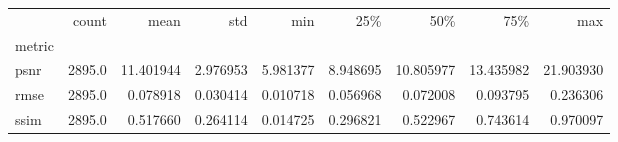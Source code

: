 \begin{tabular}{lrrrrrrrr}
	\toprule
	{}     & count  & mean      & std      & min      & 25\%     & 50\%      & 75\%      & max       \\
	metric &        &           &          &          &          &           &           &           \\
	\midrule
	psnr   & 2895.0 & 11.401944 & 2.976953 & 5.981377 & 8.948695 & 10.805977 & 13.435982 & 21.903930 \\
	rmse   & 2895.0 & 0.078918  & 0.030414 & 0.010718 & 0.056968 & 0.072008  & 0.093795  & 0.236306  \\
	ssim   & 2895.0 & 0.517660  & 0.264114 & 0.014725 & 0.296821 & 0.522967  & 0.743614  & 0.970097  \\
	\bottomrule
\end{tabular}
